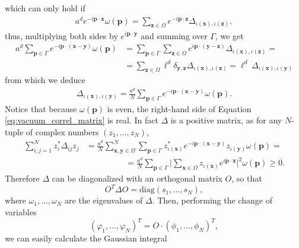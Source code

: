 \documentclass[a4paper,10pt]{report}
\begin{document}
which can only hold if
\begin{align}
a^d e^{-i\mathbf{p}\cdot\mathbf{x}}\omega(\mathbf{p}) = \sum_{\mathbf{z}\in\Omega}e^{-i\mathbf{p}\cdot\mathbf{z}}\Delta_{\iota(\mathbf{x}),\iota(\mathbf{z})},
\end{align}
thus, multiplying both sides by $e^{i\mathbf{p}\cdot\mathbf{y}}$ and summing over $\Gamma$, we get
\begin{align}
a^d\sum_{\mathbf{p}\in\Gamma}e^{-i\mathbf{p}\cdot(\mathbf{x}-\mathbf{y})}\omega(\mathbf{p}) &= \sum_{\mathbf{p}\in\Gamma}\sum_{\mathbf{z}\in\Omega}e^{i\mathbf{p}\cdot(\mathbf{y}-\mathbf{z})}\Delta_{\iota(\mathbf{x}),\iota(\mathbf{z})} = \nonumber\\
&= \sum_{\mathbf{z}\in\Omega}\ell^d\delta_{\mathbf{y},\mathbf{z}}\Delta_{\iota(\mathbf{x}),\iota(\mathbf{z})} = \ell^d\,\Delta_{\iota(\mathbf{x}),\iota(\mathbf{y})}
\end{align}
from which we deduce
\begin{align}
\label{eq:vacuum_correl_matrix}
\Delta_{\iota(\mathbf{x}),\iota(\mathbf{y})} = \frac{a^d}{N}\sum_{\mathbf{p}\in\Gamma}e^{-i\mathbf{p}\cdot(\mathbf{x}-\mathbf{y})}\omega(\mathbf{p}).
\end{align}
Notice that because $\omega(\mathbf{p})$ is even, the right-hand side of Equation \eqref{eq:vacuum_correl_matrix} is real. In fact $\Delta$ is a positive matrix, as for any $N$-tuple of complex numbers $(z_1,\dots,z_N)$,
\begin{align}
\sum_{i,j=1}^Nz_i^*\Delta_{ij}z_j &= \frac{a^d}{N}\sum_{\mathbf{x},\mathbf{y}\in\Omega}^N\sum_{\mathbf{p}\in\Gamma}z_{\iota(\mathbf{x})}^*e^{-i\mathbf{p}\cdot(\mathbf{x}-\mathbf{y})}z_{\iota(\mathbf{y})}\omega(\mathbf{p}) = \nonumber\\
&\hspace{2cm}=\frac{a^d}{N}\sum_{\mathbf{p}\in\Gamma}\bigg|\sum_{\mathbf{x}\in\Omega}z_{\iota(\mathbf{x})}e^{i\mathbf{p}\cdot\mathbf{x}}\bigg|^2\omega(\mathbf{p}) \ge0.
\end{align}
Therefore $\Delta$ can be diagonalized with an orthogonal matrix $O$, so that
\begin{equation}
O^{T}\Delta O = \mathrm{diag}(s_1,\dots,s_N),
\end{equation}
where $\omega_1,\dots,\omega_N$ are the eigenvalues of $\Delta$. Then, performing the change of variables
\begin{equation}
(\varphi_1,\dots,\varphi_N)^T = O\cdot(\phi_1,\dots,\phi_N)^T,
\end{equation}
we can easily calculate the Gaussian integral
\end{document}
